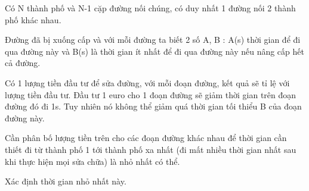 Có N thành phố và N-1 cặp đường nối chúng, có duy nhất 1 đường nối 2 thành phố khác nhau.

Đường đã bị xuống cấp và với mỗi đường ta biết 2 số A, B : A(s) thời gian để đi qua đường này và B(s) là thời gian ít nhất để đi qua đường này nếu nâng cấp hết cả đường.

Có 1 lượng tiền đầu tư để sửa đường, với mỗi đoạn đường, kết quả sẽ tỉ lệ với lượng tiền đầu tư. Đầu tư 1 euro cho 1 đoạn đường sẽ giảm thời gian trên đoạn đường đó đi 1s. Tuy nhiên nó không thể giảm quá thời gian tối thiểu B của đoạn đường này.

Cần phân bố lượng tiền trên cho các đoạn đường khác nhau để thời gian cần thiết đi từ thành phố 1 tới thành phố xa nhất (đi mất nhiều thời gian nhất sau khi thực hiện mọi sửa chữa) là nhỏ nhất có thể.

Xác định thời gian nhỏ nhất này.

\